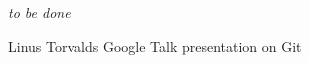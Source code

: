 \documentclass[%
	final,
	notitlepage,
	narroweqnarray,
	inline,
	twoside,
	]{ieee}
\newcommand{\latexiie}{\LaTeX2{\Large$_\varepsilon$}}
\begin{document}
\emph{to be done}



\begin{thebibliography}{1}

% 

Linus Torvalds
\newblock Google Talk presentation on Git

\end{thebibliography}

\end{document}
